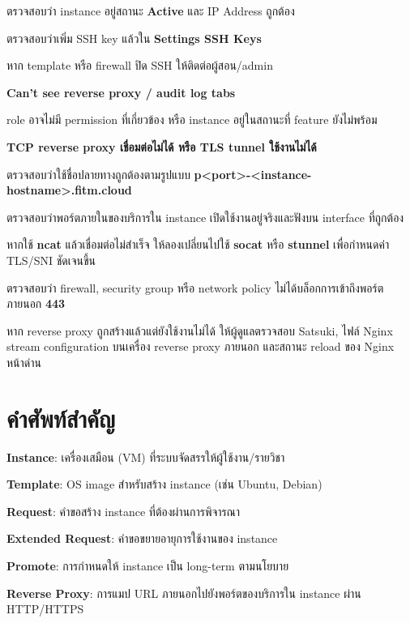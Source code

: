 \begin{mycustomenum2}
    \item ตรวจสอบว่า instance อยู่สถานะ \textbf{Active} และ IP Address ถูกต้อง
    \item ตรวจสอบว่าเพิ่ม SSH key แล้วใน \textbf{Settings \textrightarrow SSH Keys}
    \item หาก template หรือ firewall ปิด SSH ให้ติดต่อผู้สอน/admin
\end{mycustomenum2}

\vspace{0.5em}
\textbf{Can’t see reverse proxy / audit log tabs}
\vspace{0.5em}

\begin{mycustomenum2}
    \item role อาจไม่มี permission ที่เกี่ยวข้อง หรือ instance อยู่ในสถานะที่ feature ยังไม่พร้อม
\end{mycustomenum2}

\vspace{0.5em}
\textbf{TCP reverse proxy เชื่อมต่อไม่ได้ หรือ TLS tunnel ใช้งานไม่ได้}
\vspace{0.5em}

\begin{mycustomenum2}
    \item ตรวจสอบว่าใช้ชื่อปลายทางถูกต้องตามรูปแบบ \textbf{p\textless port\textgreater-\textless instance-hostname\textgreater.fitm.cloud}
    \item ตรวจสอบว่าพอร์ตภายในของบริการใน instance เปิดใช้งานอยู่จริงและฟังบน interface ที่ถูกต้อง
    \item หากใช้ \textbf{ncat} แล้วเชื่อมต่อไม่สำเร็จ ให้ลองเปลี่ยนไปใช้ \textbf{socat} หรือ \textbf{stunnel} เพื่อกำหนดค่า TLS/SNI ชัดเจนขึ้น
    \item ตรวจสอบว่า firewall, security group หรือ network policy ไม่ได้บล็อกการเข้าถึงพอร์ตภายนอก \textbf{443}
    \item หาก reverse proxy ถูกสร้างแล้วแต่ยังใช้งานไม่ได้ ให้ผู้ดูแลตรวจสอบ Satsuki, ไฟล์ Nginx stream configuration บนเครื่อง reverse proxy ภายนอก และสถานะ reload ของ Nginx หน้าด่าน
\end{mycustomenum2}

\section{คำศัพท์สำคัญ}
\hspace*{1.3em}

\begin{mycustomenum2}
    \item \textbf{Instance}: เครื่องเสมือน (VM) ที่ระบบจัดสรรให้ผู้ใช้งาน/รายวิชา
    \item \textbf{Template}: OS image สำหรับสร้าง instance (เช่น Ubuntu, Debian)
    \item \textbf{Request}: คำขอสร้าง instance ที่ต้องผ่านการพิจารณา
    \item \textbf{Extended Request}: คำขอขยายอายุการใช้งานของ instance
    \item \textbf{Promote}: การกำหนดให้ instance เป็น long-term ตามนโยบาย
    \item \textbf{Reverse Proxy}: การแมป URL ภายนอกไปยังพอร์ตของบริการใน instance ผ่าน HTTP/HTTPS
\end{mycustomenum2}
